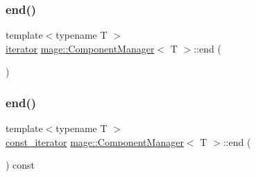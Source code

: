\mbox{\label{classmage_1_1_component_manager_a9b9dfac90c776e3cfd93f8430bd29d90}} 
\subsubsection{\texorpdfstring{end()}{end()}\hspace{0.1cm}{\footnotesize\ttfamily [1/2]}}
{\footnotesize\ttfamily template$<$typename T $>$ \\
\mbox{\hyperlink{classmage_1_1_component_manager_a28023a75938eb74870ba4b5952ddb61f}{iterator}} \mbox{\hyperlink{classmage_1_1_component_manager}{mage\+::\+Component\+Manager}}$<$ T $>$\+::end (\begin{DoxyParamCaption}{ }\end{DoxyParamCaption})\hspace{0.3cm}{\ttfamily [noexcept]}}

\mbox{\label{classmage_1_1_component_manager_a674b03ad45a62f2e5af1a076b97f873c}} 
\subsubsection{\texorpdfstring{end()}{end()}\hspace{0.1cm}{\footnotesize\ttfamily [2/2]}}
{\footnotesize\ttfamily template$<$typename T $>$ \\
\mbox{\hyperlink{classmage_1_1_component_manager_acc0d5ab8de4583ae2dd99c7bc0784c95}{const\+\_\+iterator}} \mbox{\hyperlink{classmage_1_1_component_manager}{mage\+::\+Component\+Manager}}$<$ T $>$\+::end (\begin{DoxyParamCaption}{ }\end{DoxyParamCaption}) const\hspace{0.3cm}{\ttfamily [noexcept]}}

\mbox{\label{classmage_1_1_component_manager_a48b0c1e1b0efac98bb54b8c78e1dde65}} 
